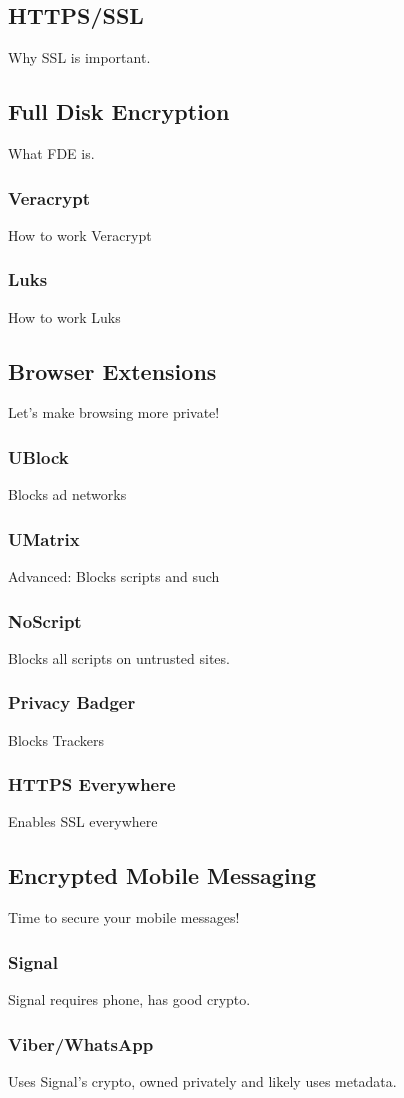 \subsection{HTTPS/SSL}
Why SSL is important.
\subsection{Full Disk Encryption}
What FDE is.
\subsubsection{Veracrypt}
How to work Veracrypt
\subsubsection{Luks}
How to work Luks
\subsection{Browser Extensions}
Let's make browsing more private!
\subsubsection{UBlock}
Blocks ad networks
\subsubsection{UMatrix}
Advanced: Blocks scripts and such
\subsubsection{NoScript}
Blocks all scripts on untrusted sites.
\subsubsection{Privacy Badger}
Blocks Trackers
\subsubsection{HTTPS Everywhere}
Enables SSL everywhere
\subsection{Encrypted Mobile Messaging}
Time to secure your mobile messages!
\subsubsection{Signal}
Signal requires phone, has good crypto.
\subsubsection{Viber/WhatsApp}
Uses Signal's crypto, owned privately and likely uses metadata.
